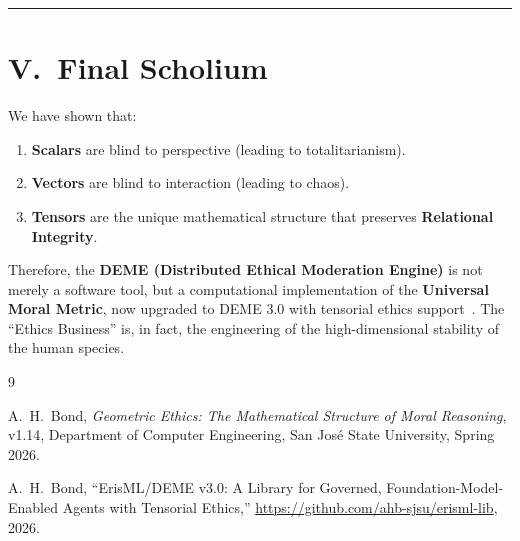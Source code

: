 \documentclass[12pt]{article}
\theoremstyle{remark}
\begin{document}
\bigskip
\hrule
\bigskip

\section*{V.\ Final Scholium}

We have shown that:

\begin{enumerate}
    \item \textbf{Scalars} are blind to perspective (leading to
    totalitarianism).

    \item \textbf{Vectors} are blind to interaction (leading to chaos).

    \item \textbf{Tensors} are the unique mathematical structure that preserves
    \textbf{Relational Integrity}.
\end{enumerate}

Therefore, the \textbf{DEME (Distributed Ethical Moderation Engine)} is not
merely a software tool, but a computational implementation of the
\textbf{Universal Moral Metric}, now upgraded to DEME 3.0 with tensorial ethics support~\cite{bond2026erisml}. The ``Ethics Business'' is, in fact, the
engineering of the high-dimensional stability of the human species.

\begin{thebibliography}{9}

A.~H.~Bond, \emph{Geometric Ethics: The Mathematical Structure of Moral Reasoning}, v1.14, Department of Computer Engineering, San Jos\'e State University, Spring 2026.

A.~H.~Bond, ``ErisML/DEME v3.0: A Library for Governed, Foundation-Model-Enabled Agents with Tensorial Ethics,'' \url{https://github.com/ahb-sjsu/erisml-lib}, 2026.

\end{thebibliography}
\end{document}

